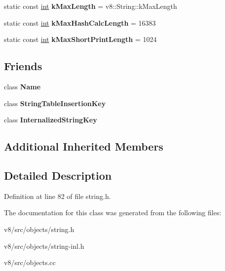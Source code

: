\begin{DoxyCompactItemize}
static const \mbox{\hyperlink{classint}{int}} {\bfseries k\+Max\+Length} = v8\+::\+String\+::k\+Max\+Length
\item 
\mbox{\label{classv8_1_1internal_1_1String_a51b6ca2dcf6d8bdb10c510d580e0e3f4}} 
static const \mbox{\hyperlink{classint}{int}} {\bfseries k\+Max\+Hash\+Calc\+Length} = 16383
\item 
\mbox{\label{classv8_1_1internal_1_1String_a615a212c4e682f2aef5f3c45faaba643}} 
static const \mbox{\hyperlink{classint}{int}} {\bfseries k\+Max\+Short\+Print\+Length} = 1024
\end{DoxyCompactItemize}
\subsection*{Friends}
\begin{DoxyCompactItemize}
\item 
\mbox{\label{classv8_1_1internal_1_1String_aa5584a36f0e4c358cedb1416f5429051}} 
class {\bfseries Name}
\item 
\mbox{\label{classv8_1_1internal_1_1String_a1fbe4fdc255e8e29ccb2f71a44347fce}} 
class {\bfseries String\+Table\+Insertion\+Key}
\item 
\mbox{\label{classv8_1_1internal_1_1String_af61719e6635ae58febd00099a609dadf}} 
class {\bfseries Internalized\+String\+Key}
\end{DoxyCompactItemize}
\subsection*{Additional Inherited Members}


\subsection{Detailed Description}


Definition at line 82 of file string.\+h.



The documentation for this class was generated from the following files\+:\begin{DoxyCompactItemize}
\item 
v8/src/objects/string.\+h\item 
v8/src/objects/string-\/inl.\+h\item 
v8/src/objects.\+cc\end{DoxyCompactItemize}
